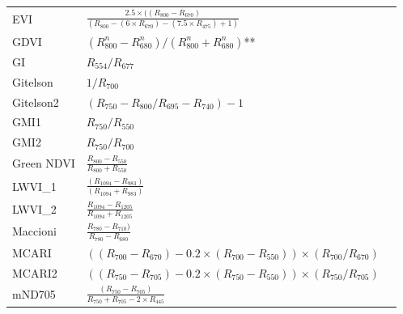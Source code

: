\documentclass[remotesensing,article,submit,moreauthors,pdftex]{Definitions/mdpi}
\begin{document}
{\begin{supertabular}{lll}
		EVI             & $\frac{2.5\times ((R_{800}-R_{670}) }{ (R_{800}-(6\times R_{670})-(7.5\times R_{475})+1)}$           & \cite{huete1997}             \\
		GDVI            & $(R_{800}^n-R_{680}^n) / (R_{800}^n+R_{680}^n)$**                                                    & \cite{wu2014}                 \\
		GI              & $R_{554}/R_{677}$                                                                                    & \cite{smith1995}              \\
		Gitelson        & $1/R_{700}$                                                                                          & \cite{gitelson1999}           \\
		Gitelson2       & $(R_{750}-R_{800}/R_{695}-R_{740})-1$                                                                & \cite{gitelson2003}           \\
		GMI1            & $R_{750}/R_{550}$                                                                                    & \cite{gitelson2003}           \\
		GMI2            & $R_{750}/R_{700}$                                                                                    & \cite{gitelson2003}           \\
		Green NDVI      & $\frac{R_{800}-R_{550}}{R_{800}+R_{550}}$                                                            & \cite{gitelson1996}           \\
		LWVI\_1         & $\frac{(R_{1094}-R_{983})}{(R_{1094}+R_{983})}$                                                      & \cite{galvao2005}             \\
		LWVI\_2         & $\frac{R_{1094}-R_{1205}}{R_{1094}+R_{1205}}$                                                        & \cite{galvao2005}             \\
		Maccioni        & $\frac{R_{780}-R_{710})}{R_{780}-R_{680}}$                                                           & \cite{maccioni2001}           \\
		\midrule
		MCARI           & \parbox{5.5cm}{$((R_{700}-R_{670})-0.2\times (R_{700}-R_{550})) \times (R_{700}/R_{670})$}           & \cite{daughtry2000}           \\
		\midrule
		MCARI2          & \parbox{5.5cm}{$((R_{750}-R_{705})-0.2 \times (R_{750}-R_{550})) \times (R_{750}/R_{705})$}          & \cite{wu2008}                \\
		\midrule
		mND705          & $\frac{(R_{750}-R_{705})}{R_{750}+R_{705}-2\times R_{445}}$                                          & \cite{sims2002}              \\

\end{supertabular}}
\end{document}
